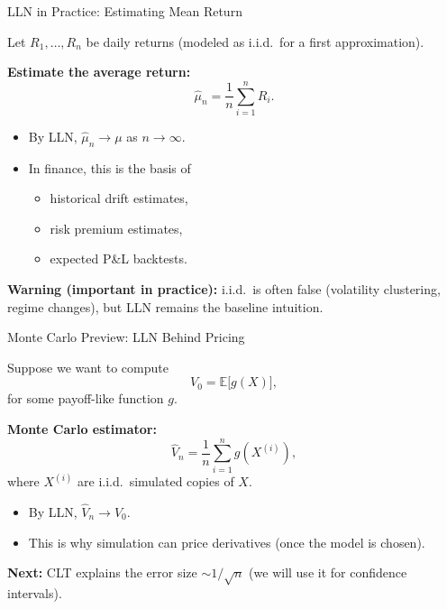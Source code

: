 \documentclass[10pt,aspectratio=169]{beamer}
\begin{document}
\begin{frame}{LLN in Practice: Estimating Mean Return}

Let \(R_1,\dots,R_n\) be daily returns (modeled as i.i.d.\ for a first approximation).\pause

\medskip
\textbf{Estimate the average return:}\pause
\[
\widehat{\mu}_n = \frac{1}{n}\sum_{i=1}^n R_i.
\]

\medskip
\begin{itemize}
  \item By LLN, \(\widehat{\mu}_n \to \mu\) as \(n\to\infty\).\pause
  \item In finance, this is the basis of\pause
  \begin{itemize}
    \item historical drift estimates,\pause
    \item risk premium estimates,\pause
    \item expected P\&L backtests.\pause
  \end{itemize}
\end{itemize}

\medskip
\textbf{Warning (important in practice):}\pause\;
i.i.d.\ is often false (volatility clustering, regime changes), but LLN remains the baseline intuition.
\end{frame}

\begin{frame}{Monte Carlo Preview: LLN Behind Pricing}

Suppose we want to compute
\[
V_0 = \mathbb{E}\big[g(X)\big],
\]
for some payoff-like function \(g\).\pause

\medskip
\textbf{Monte Carlo estimator:}\pause
\[
\widehat{V}_n = \frac{1}{n}\sum_{i=1}^n g(X^{(i)}),
\]
where \(X^{(i)}\) are i.i.d.\ simulated copies of \(X\).\pause

\medskip
\begin{itemize}
  \item By LLN, \(\widehat{V}_n \to V_0\).\pause
  \item This is why simulation can price derivatives (once the model is chosen).\pause
\end{itemize}

\medskip
\textbf{Next:}\pause\; CLT explains the error size \(\sim 1/\sqrt{n}\) (we will use it for confidence intervals).
\end{frame}
\end{document}
